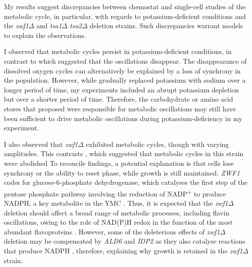 My results suggest discrepancies between chemostat and single-cell studies of the metabolic cycle, in particular, with regards to potassium-deficient conditions and the \textit{zwf1$\Delta$} and \textit{tsa1$\Delta$ tsa2$\Delta$} deletion strains.
Such discrepancies warrant models to explain the observations.

I observed that metabolic cycles persist in potassium-deficient conditions, in contrast to \textcite{oneillEukaryoticCellBiology2020} which suggested that the oscillations disappear.
The disappearance of dissolved oxygen cycles can alternatively be explained by a loss of synchrony in the population.
However, while \textcite{oneillEukaryoticCellBiology2020} gradually replaced potassium with sodium over a longer period of time, my experiments included an abrupt potassium depletion but over a shorter period of time.
Therefore, the carbohydrate or amino acid stores that \textcite{oneillEukaryoticCellBiology2020} proposed were responsible for metabolic oscillations may still have been sufficient to drive metabolic oscillations during potassium-deficiency in my experiment.

I also observed that \textit{zwf1$\Delta$} exhibited metabolic cycles, though with varying amplitudes.
This contrasts \textcite{tuCyclicChangesMetabolic2007}, which suggested that metabolic cycles in this strain were abolished
To reconcile findings, a potential explanation is that cells lose synchrony or the ability to reset phase, while growth is still maintained.
\textit{ZWF1} codes for glucose-6-phosphate dehydrogenase, which catalyses the first step of the pentose phosphate pathway involving the reduction of NADP\textsuperscript{+} to produce NADPH, a key metabolite in the YMC \parencite{nogaeIsolationCharacterizationZWF11990}.
Thus, it is expected that the \textit{zwf1$\Delta$} deletion should affect a broad range of metabolic processes, including flavin oscillations, owing to the role of NAD(P)H redox in the function of the most abundant flavoproteins \parencite{gudipatiFlavoproteomeYeastSaccharomyces2014}.
However, some of the deleterious effects of \textit{zwf1$\Delta$} deletion may be compensated by \textit{ALD6} and \textit{IDP2} as they also catalyse reactions that produce NADPH \parencite{minardSourcesNADPHYeast2005}, therefore, explaining why growth is retained in the \textit{zwf1$\Delta$} strain.

